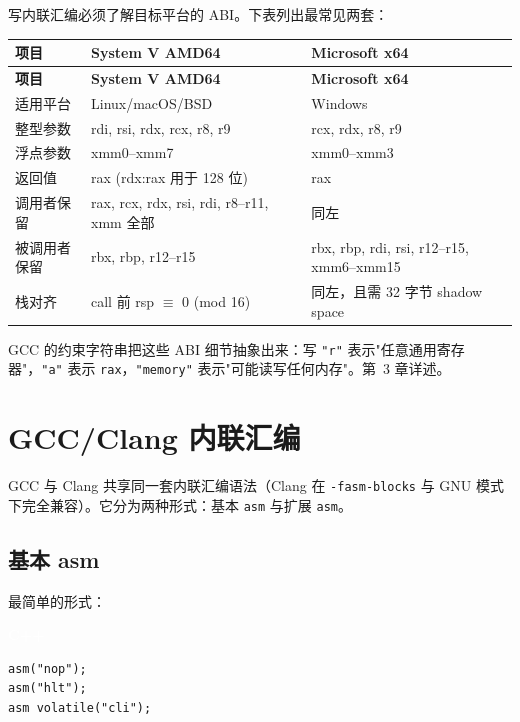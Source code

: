 \documentclass[12pt,a4paper,fontset=fandol]{ctexbook}
\newcommand{\cpplabel}{%
  \begin{tcolorbox}[enhanced,colback=cppheadbg,colframe=cppheadbg,
    arc=1mm,boxrule=0mm,left=6pt,right=6pt,top=2pt,bottom=2pt,
    halign=left,oversize]
    \textcolor{white}{\small\bfseries C++}
  \end{tcolorbox}\vspace{-4pt}}
\begin{document}
写内联汇编必须了解目标平台的 ABI。下表列出最常见两套：

\begin{longtable}{>{\raggedright\arraybackslash}p{2.4cm}>{\raggedright\arraybackslash}p{5.4cm}>{\raggedright\arraybackslash}p{5.4cm}}
\toprule
\textbf{项目} & \textbf{System V AMD64} & \textbf{Microsoft x64} \\
\midrule
\endfirsthead
\toprule
\textbf{项目} & \textbf{System V AMD64} & \textbf{Microsoft x64} \\
\midrule
\endhead
适用平台      & Linux/macOS/BSD                & Windows \\
整型参数      & rdi, rsi, rdx, rcx, r8, r9     & rcx, rdx, r8, r9 \\
浮点参数      & xmm0--xmm7                     & xmm0--xmm3 \\
返回值        & rax (rdx:rax 用于 128 位)      & rax \\
调用者保留    & rax, rcx, rdx, rsi, rdi, r8--r11, xmm 全部 & 同左 \\
被调用者保留  & rbx, rbp, r12--r15             & rbx, rbp, rdi, rsi, r12--r15, xmm6--xmm15 \\
栈对齐        & call 前 rsp $\equiv$ 0 (mod 16) & 同左，且需 32 字节 shadow space \\
\bottomrule
\end{longtable}

GCC 的约束字符串把这些 ABI 细节抽象出来：写 \texttt{"r"} 表示"任意通用寄存器"，\texttt{"a"} 表示 \texttt{rax}，\texttt{"memory"} 表示"可能读写任何内存"。第~3 章详述。

\chapter{GCC/Clang 内联汇编}\label{ch:gcc-asm}

GCC 与 Clang 共享同一套内联汇编语法（Clang 在 \texttt{-fasm-blocks} 与 GNU 模式下完全兼容）。它分为两种形式：基本 \texttt{asm} 与扩展 \texttt{asm}。

\section{基本 asm}\label{sec:basic-asm}

最简单的形式：

\cpplabel
\begin{lstlisting}[style=cppstyle]
asm("nop");
asm("hlt");
asm volatile("cli");
\end{lstlisting}
\end{document}
